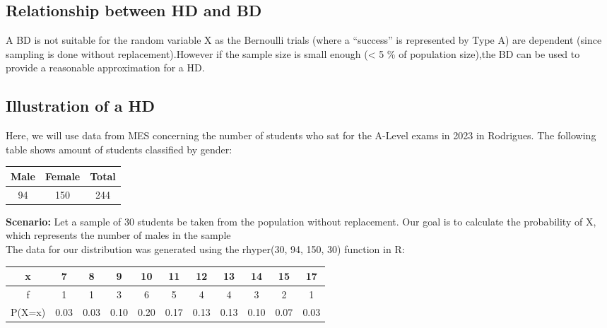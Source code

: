 \documentclass{article}
\begin{document}
\subsection{Relationship between HD and BD}
A BD is not suitable for the random variable X as the Bernoulli trials
(where a “success” is represented by Type A) are dependent 
(since sampling is done without replacement).However if the sample 
size is small enough (< 5 \% of population size),the BD can be used 
to provide a reasonable approximation for a HD.

\subsection{Illustration of a HD}
Here, we will use data from MES concerning the number of students
who sat for the A-Level exams in 2023 in Rodrigues. The following
table shows amount of students classified by gender:

\begin{center}
  \begin{tabular}{|c|c|c|}
    \hline
    \textbf{Male} & \textbf{Female} & \textbf{Total} \\
    \hline
    \hline
    94 & 150 & 244 \\
    \hline
  \end{tabular}
\end{center}

\textbf{Scenario:}
Let a sample of 30 students be taken from the population without
replacement. Our goal is to calculate the probability of X, which
represents the number of males in the sample \\


The data for our distribution was generated using the 
rhyper(30, 94, 150, 30) function in R:

\begin{center}
  \begin{tabular}{|c|c|c|c|c|c|c|c|c|c|c|}
    \hline
    x & 7 & 8 & 9 & 10 & 11 & 12 & 13 & 14 & 15 & 17 \\
    \hline
    f & 1 & 1 & 3 & 6 & 5 & 4 & 4 & 3 & 2 & 1 \\
    \hline
    P(X=x) & 0.03 & 0.03 & 0.10 & 0.20 & 0.17 & 0.13 & 0.13 & 0.10 & 0.07 & 0.03 \\
    \hline
  \end{tabular}
\end{center}
\end{document}
